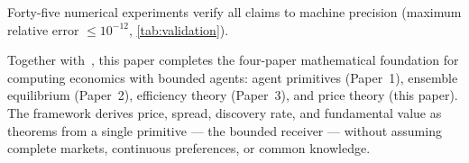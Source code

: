 \documentclass[twocolumn,11pt,a4paper]{article}
\theoremstyle{remark}
\begin{document}
Forty-five numerical experiments verify all claims to machine precision
(maximum relative error $\le 10^{-12}$, \cref{tab:validation}).

Together with~\cite{sachikonye2025agents,sachikonye2025market,sachikonye2025het},
this paper completes the four-paper mathematical foundation for computing
economics with bounded agents: agent primitives (Paper~1), ensemble
equilibrium (Paper~2), efficiency theory (Paper~3), and price theory (this
paper).  The framework derives price, spread, discovery rate, and fundamental
value as theorems from a single primitive — the bounded receiver — without
assuming complete markets, continuous preferences, or common knowledge.



\end{document}
